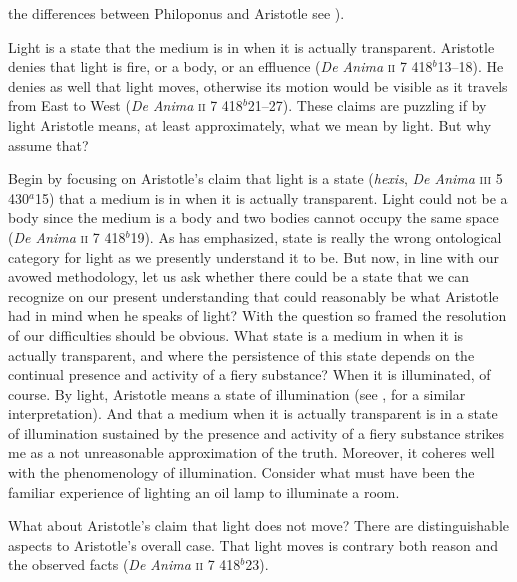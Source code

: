 the differences between Philoponus and Aristotle see \citealt{Groot:1983fa}).

Light is a state that the medium is in when it is actually transparent. Aristotle denies that light is fire, or a body, or an effluence (\emph{De Anima} \textsc{ii} 7 418\( ^{b} \)13--18). He denies as well that light moves, otherwise its motion would be visible as it travels from East to West (\emph{De Anima} \textsc{ii} 7 418\( ^{b} \)21--27). These claims are puzzling if by light Aristotle means, at least approximately, what we mean by light. But why assume that? 

Begin by focusing on Aristotle's claim that light is a state (\emph{hexis}, \emph{De Anima} \textsc{iii} 5 430\( ^{a} \)15) that a medium is in when it is actually transparent. Light could not be a body since the medium is a body and two bodies cannot occupy the same space (\emph{De Anima} \textsc{ii} 7 418\( ^{b} \)19). As \citet{Burnyeat:1995fk} has emphasized, state is really the wrong ontological category for light as we presently understand it to be. But now, in line with our avowed methodology, let us ask whether there could be a state that we can recognize on our present understanding that could reasonably be what Aristotle had in mind when he speaks of light? With the question so framed the resolution of our difficulties should be obvious. What state is a medium in when it is actually transparent, and where the persistence of this state depends on the continual presence and activity of a fiery substance? When it is illuminated, of course. By light, Aristotle means a state of illumination (see \citealt[122]{Thorp:1982fk}, for a similar interpretation). And that a medium when it is actually transparent is in a state of illumination sustained by the presence and activity of a fiery substance strikes me as a not unreasonable approximation of the truth. Moreover, it coheres well with the phenomenology of illumination. Consider what must have been the familiar experience of lighting an oil lamp to illuminate a room.

What about Aristotle's claim that light does not move? There are distinguishable aspects to Aristotle's overall case. That light moves is contrary both reason and the observed facts (\emph{De Anima} \textsc{ii} 7 418\( ^{b} \)23).

